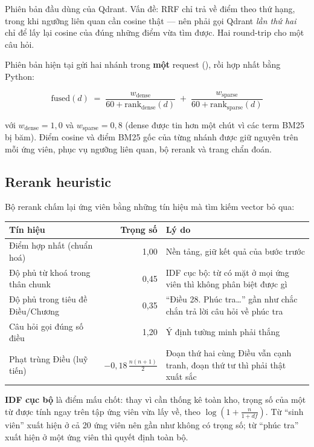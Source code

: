 Phiên bản đầu dùng  của Qdrant. Vấn đề: RRF chỉ trả về điểm theo thứ
hạng, trong khi ngưỡng liên quan cần cosine thật — nên phải gọi Qdrant \emph{lần thứ hai} chỉ
để lấy lại cosine của đúng những điểm vừa tìm được. Hai round-trip cho một câu hỏi.

Phiên bản hiện tại gửi hai nhánh trong \textbf{một} request (), rồi
hợp nhất bằng Python:

\[
\mathrm{fused}(d) \;=\; \frac{w_{\text{dense}}}{60 + \mathrm{rank}_{\text{dense}}(d)}
\;+\; \frac{w_{\text{sparse}}}{60 + \mathrm{rank}_{\text{sparse}}(d)}
\]

với $w_{\text{dense}} = 1{,}0$ và $w_{\text{sparse}} = 0{,}8$ (dense được tin hơn một chút vì
các term BM25 bị băm). Điểm cosine và điểm BM25 gốc của từng nhánh được giữ nguyên trên mỗi ứng
viên, phục vụ ngưỡng liên quan, bộ rerank và trang chẩn đoán.

\subsection{Rerank heuristic}
\label{sec:rerank}

Bộ rerank chấm lại ứng viên bằng những tín hiệu mà tìm kiếm vector bỏ qua:

\begin{rtable}
\begin{tabular}{@{}p{} r p{}@{}}
\toprule
\textbf{Tín hiệu} & \textbf{Trọng số} & \textbf{Lý do} \\
\midrule
Điểm hợp nhất (chuẩn hoá) & 1,00 & Nền tảng, giữ kết quả của bước trước \\
Độ phủ từ khoá trong thân chunk & 0,45 & IDF cục bộ: từ có mặt ở mọi ứng viên thì không phân biệt được gì \\
Độ phủ trong tiêu đề Điều/Chương & 0,35 & “Điều 28. Phúc tra…” gần như chắc chắn trả lời câu hỏi về phúc tra \\
Câu hỏi gọi đúng số điều & 1,20 & Ý định tường minh phải thắng \\
Phạt trùng Điều (luỹ tiến) & $-0{,}18\,\tfrac{n(n+1)}{2}$ & Đoạn thứ hai cùng Điều vẫn cạnh tranh, đoạn thứ tư thì phải thật xuất sắc \\
\bottomrule
\end{tabular}
\label{tab:rerank}
\end{rtable}

\textbf{IDF cục bộ} là điểm mấu chốt: thay vì cần thống kê toàn kho, trọng số của một từ được
tính ngay trên tập ứng viên vừa lấy về, theo $\log\!\left(1 + \frac{n}{1+df}\right)$. Từ “sinh
viên” xuất hiện ở cả 20 ứng viên nên gần như không có trọng số; từ “phúc tra” xuất hiện ở một
ứng viên thì quyết định toàn bộ.

